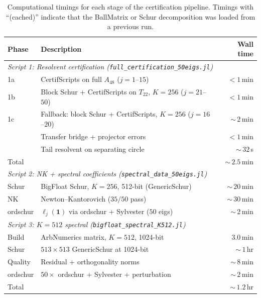 \documentclass[11pt]{article}
\begin{document}
\begin{table}[ht]
\centering
\caption{Computational timings for each stage of the certification pipeline.
Timings with ``(cached)'' indicate that the BallMatrix or Schur decomposition was loaded from a previous run.}
\label{tab:timings}
\begin{tabular}{lp{7.5cm}r}
\toprule
Phase & Description & Wall time \\
\midrule
\multicolumn{3}{l}{\emph{Script 1: Resolvent certification (\texttt{full\_certification\_50eigs.jl})}} \\
\quad 1a & CertifScripts on full $A_{48}$ ($j = 1$--$15$) & $<\!1$\,min \\
\quad 1b & Block Schur + CertifScripts on $T_{22}$, $K\!=\!256$ ($j = 21$--$50$) & $<\!1$\,min \\
\quad 1c & Fallback: block Schur + CertifScripts, $K\!=\!256$ ($j = 16$--$20$) & ${\sim}\,2$\,min \\
\quad 2 & Transfer bridge + projector errors & $<\!1$\,min \\
\quad 3 & Tail resolvent on separating circle & ${\sim}\,32$\,s \\
\quad Total & & ${\sim}\,2.5$\,min \\
\midrule
\multicolumn{3}{l}{\emph{Script 2: NK + spectral coefficients (\texttt{spectral\_data\_50eigs.jl})}} \\
\quad Schur & BigFloat Schur, $K\!=\!256$, 512-bit (GenericSchur) & ${\sim}\,20$\,min \\
\quad NK & Newton--Kantorovich ($35/50$ pass) & ${\sim}\,30$\,min \\
\quad ordschur & $\ell_j(\mathbf{1})$ via ordschur + Sylvester ($50$ eigs) & ${\sim}\,2$\,min \\
\midrule
\multicolumn{3}{l}{\emph{Script 3: $K\!=\!512$ spectral (\texttt{bigfloat\_spectral\_K512.jl})}} \\
\quad Build & ArbNumerics matrix, $K\!=\!512$, 1024-bit & $3.0$\,min \\
\quad Schur & $513 \times 513$ GenericSchur at 1024-bit & ${\sim}\,1$\,hr \\
\quad Quality & Residual + orthogonality norms & ${\sim}\,8$\,min \\
\quad ordschur & $50 \times$ ordschur + Sylvester + perturbation & ${\sim}\,2$\,min \\
\quad Total & & ${\sim}\,1.2$\,hr \\
\bottomrule
\end{tabular}
\end{table}
\end{document}
